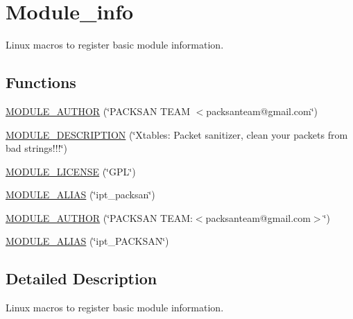 \hypertarget{group__Module__info}{
\section{Module\_\-info}
\label{group__Module__info}
}


Linux macros to register basic module information.  


\subsection*{Functions}
\begin{DoxyCompactItemize}
\item 
\hyperlink{group__Module__info_ga951bcda00d8a487070fd7be5c363d943}{MODULE\_\-AUTHOR} (\char`\"{}PACKSAN TEAM $<$packsanteam@gmail.com\char`\"{})
\item 
\hyperlink{group__Module__info_ga7884adf036695ba839028e1d0f7e8d17}{MODULE\_\-DESCRIPTION} (\char`\"{}Xtables: Packet sanitizer, clean your packets from bad strings!!!\char`\"{})
\item 
\hyperlink{group__Module__info_gad94b36675e7eb067ea3ce6ff9e244a44}{MODULE\_\-LICENSE} (\char`\"{}GPL\char`\"{})
\item 
\hyperlink{group__Module__info_gae1143a6664694334dd30c6e934afafe8}{MODULE\_\-ALIAS} (\char`\"{}ipt\_\-packsan\char`\"{})
\item 
\hyperlink{group__Module__info_ga184bfbc3a7ee1f2642b68330b6ffe735}{MODULE\_\-AUTHOR} (\char`\"{}PACKSAN TEAM:$<$packsanteam@gmail.com$>$\char`\"{})
\item 
\hyperlink{group__Module__info_ga9a25cec7f2114963efbbea43c4d28ff6}{MODULE\_\-ALIAS} (\char`\"{}ipt\_\-PACKSAN\char`\"{})
\end{DoxyCompactItemize}


\subsection{Detailed Description}
Linux macros to register basic module information. 

